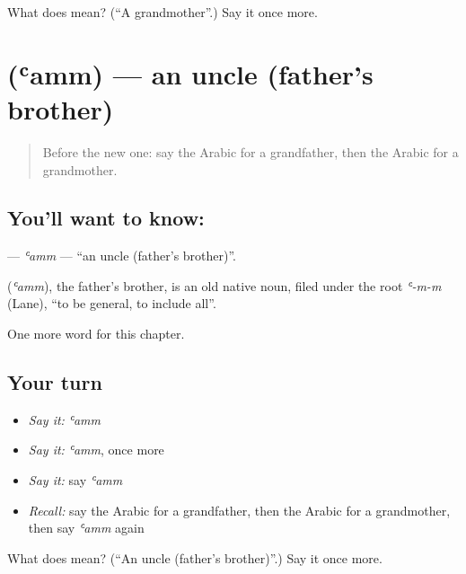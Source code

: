 \begin{tcolorbox}[breakable,colback=teal!4,colframe=teal!35!black,title={Before you move on}]
What does  mean? (\textquotedblleft{}A grandmother\textquotedblright{}.) Say it once more.
\end{tcolorbox}
\section[\texorpdfstring{\ar{عم} (ʿamm)}{عم (ʿamm)}]{ (ʿamm) — an uncle (father's brother)}

\label{lesson:AR-C55-amm}



\begin{quote}
Before the new one: say the Arabic for a grandfather, then the Arabic for a grandmother.
\end{quote}

\subsection*{You'll want to know: }
\textbf{} — \emph{ʿamm} — \textquotedblleft{}an uncle (father's brother)\textquotedblright{}.

\begin{cousinweb}
\textbf{} (\emph{ʿamm}), the father's brother, is an old native noun, filed under the root \emph{ʿ-m-m} (Lane), \textquotedblleft{}to be general, to include all\textquotedblright{}.
\end{cousinweb}

\begin{grammarlens}[title={What you've built}]
One more word for this chapter.
\end{grammarlens}

\subsection*{Your turn}
\begin{itemize}
\raggedright
  \item \emph{Say it:} \emph{ʿamm}
  \item \emph{Say it:} \emph{ʿamm}, once more
  \item \emph{Say it:} say \emph{ʿamm}
  \item \emph{Recall:} say the Arabic for a grandfather, then the Arabic for a grandmother, then say \emph{ʿamm} again
\end{itemize}

\begin{tcolorbox}[breakable,colback=teal!4,colframe=teal!35!black,title={Before you move on}]
What does  mean? (\textquotedblleft{}An uncle (father's brother)\textquotedblright{}.) Say it once more.
\end{tcolorbox}
